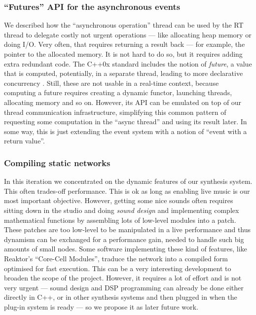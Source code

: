 \subsubsection{``Futures'' API for the asynchronous events}

We described how the ``asynchronous operation'' thread can be used by
the RT thread to delegate costly not urgent operations --- like
allocating heap memory or doing I/O. Very often, that requires
returning a result back --- for example, the pointer to the allocated
memory. It is not hard to do so, but it requires adding extra
redundant code. The C++0x standard includes the notion of
\emph{future}, a value that is computed, potentially, in a separate
thread, leading to more declarative concurrency
\cite{howard06mt}. Still, these are not usable in a real-time context,
because computing a future requires creating a dynamic functor,
launching threads, allocating memory and so on. However, its API can
be emulated on top of our thread communication infrastructure,
simplifying this common pattern of requesting some computation in the
``async thread'' and using its result later. In some way, this is just
extending the event system with a notion of ``event with a return
value''.

\subsubsection{Compiling static networks}

In this iteration we concentrated on the dynamic features of our
synthesis system. This often trades-off performance. This is ok as
long as enabling live music is our most important objective. However,
getting some nice sounds often requires sitting down in the studio and
doing \emph{sound design} and implementing complex
mathematical functions by assembling lots of low-level modules into a
patch. These patches are too low-level to be manipulated in a live
performance and thus dynamism can be exchanged for a performance gain,
needed to handle such big amounts of small nodes. Some software
implementing these kind of features, like Reaktor's ``Core-Cell
Modules'', traduce the network into a compiled form optimised for fast
execution. This can be a very interesting development to broaden the
scope of the project. However, it requires a lot of effort and is not
very urgent --- sound design and DSP programming can already be done
either directly in C++, or in other synthesis systems and then plugged
in when the plug-in system is ready --- so we propose it as later
future work.

